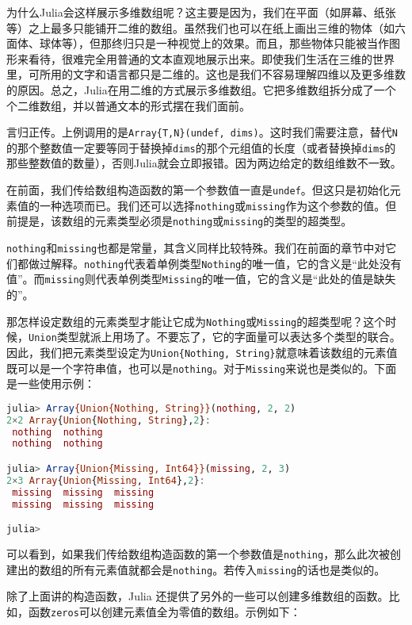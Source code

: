 为什么Julia会这样展示多维数组呢？这主要是因为，我们在平面（如屏幕、纸张等）之上最多只能铺开二维的数组。虽然我们也可以在纸上画出三维的物体（如六面体、球体等），但那终归只是一种视觉上的效果。而且，那些物体只能被当作图形来看待，很难完全用普通的文本直观地展示出来。即使我们生活在三维的世界里，可所用的文字和语言都只是二维的。这也是我们不容易理解四维以及更多维数的原因。总之，Julia在用二维的方式展示多维数组。它把多维数组拆分成了一个个二维数组，并以普通文本的形式摆在我们面前。

言归正传。上例调用的是\verb`Array{T,N}(undef, dims)`。这时我们需要注意，替代\verb`N`的那个整数值一定要等同于替换掉\verb`dims`的那个元组值的长度（或者替换掉\verb`dims`的那些整数值的数量），否则Julia就会立即报错。因为两边给定的数组维数不一致。

在前面，我们传给数组构造函数的第一个参数值一直是\verb`undef`。但这只是初始化元素值的一种选项而已。我们还可以选择\verb`nothing`或\verb`missing`作为这个参数的值。但前提是，该数组的元素类型必须是\verb`nothing`或\verb`missing`的类型的超类型。

\verb`nothing`和\verb`missing`也都是常量，其含义同样比较特殊。我们在前面的章节中对它们都做过解释。\verb`nothing`代表着单例类型\verb`Nothing`的唯一值，它的含义是“此处没有值”。而\verb`missing`则代表单例类型\verb`Missing`的唯一值，它的含义是“此处的值是缺失的”。

那怎样设定数组的元素类型才能让它成为\verb`Nothing`或\verb`Missing`的超类型呢？这个时候，\verb`Union`类型就派上用场了。不要忘了，它的字面量可以表达多个类型的联合。因此，我们把元素类型设定为\verb`Union{Nothing, String}`就意味着该数组的元素值既可以是一个字符串值，也可以是\verb`nothing`。对于\verb`Missing`来说也是类似的。下面是一些使用示例：

\begin{lstlisting}[language=julia]
julia> Array{Union{Nothing, String}}(nothing, 2, 2)
2×2 Array{Union{Nothing, String},2}:
 nothing  nothing
 nothing  nothing

julia> Array{Union{Missing, Int64}}(missing, 2, 3)
2×3 Array{Union{Missing, Int64},2}:
 missing  missing  missing
 missing  missing  missing

julia> 
\end{lstlisting}

可以看到，如果我们传给数组构造函数的第一个参数值是\verb`nothing`，那么此次被创建出的数组的所有元素值就都会是\verb`nothing`。若传入\verb`missing`的话也是类似的。

除了上面讲的构造函数，Julia 还提供了另外的一些可以创建多维数组的函数。比如，函数\verb`zeros`可以创建元素值全为零值的数组。示例如下：

